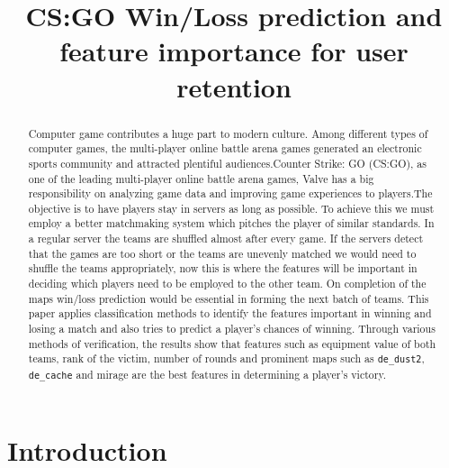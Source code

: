 \documentclass[conference]{IEEEtran}
\begin{document}
	
\title{CS:GO Win/Loss prediction and feature importance for user retention}


\author{

}

\maketitle

\begin{abstract}
Computer game contributes a huge part to modern culture. Among different types of computer games, the multi-player online battle arena games generated an electronic sports community and attracted plentiful audiences.Counter Strike: GO (CS:GO), as one of the leading multi-player online battle arena games, Valve has a big responsibility on analyzing game data and improving game experiences to players.The objective is to have players stay in servers as long as possible. To achieve this we must employ a better matchmaking system which pitches the player of similar standards. In a regular server the teams are shuffled almost after every game. If the servers detect that the games are too short or the teams are unevenly matched we would need to shuffle the teams appropriately, now this is where the features will be important in deciding which players need to be employed to the other team. On completion of the maps win/loss prediction would be essential in forming the next batch of teams. This paper applies classification methods to identify the features important in winning and losing a match and also tries to predict a player's chances of winning. Through various methods of verification, the results show that features such as equipment value of both teams, rank of the victim, number of rounds and prominent maps such as \texttt{de\_dust2}, \texttt{de\_cache} and mirage are the best features in determining a player's victory.

\end{abstract}

\IEEEpeerreviewmaketitle



\section{Introduction}
\end{document}
